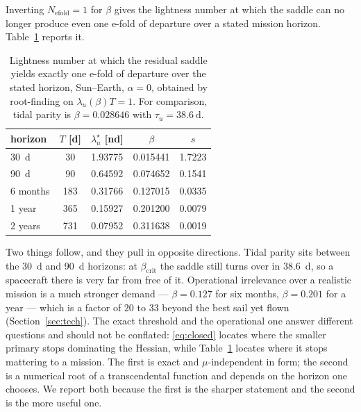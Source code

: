 \documentclass[pdflatex,sn-mathphys-num]{sn-jnl}
\begin{document}
Inverting $N_{\mathrm{efold}}=1$ for $\beta$ gives the lightness number at which
the saddle can no longer produce even one e-fold of departure over a stated
mission horizon. Table~\ref{tab:efold} reports it.

\begin{table}[t]
  \centering
  \caption{Lightness number at which the residual saddle yields exactly one
  e-fold of departure over the stated horizon, Sun--Earth, $\alpha=0$, obtained
  by root-finding on $\lambda_u(\beta)T=1$. For comparison, tidal parity is
  $\beta=\num{0.028646}$ with $\tau_u=\SI{38.6}{\day}$.}
  \label{tab:efold}
  \begin{tabular}{lcccc}
    \toprule
    horizon & $T$ [d] & $\lambda_u^{\star}$ [nd] & $\beta$ & $s$ \\
    \midrule
    \SI{30}{\day}  & \num{30}  & \num{1.93775} & \num{0.015441} & \num{1.7223} \\
    \SI{90}{\day}  & \num{90}  & \num{0.64592} & \num{0.074652} & \num{0.1541} \\
    6 months       & \num{183} & \num{0.31766} & \num{0.127015} & \num{0.0335} \\
    1 year         & \num{365} & \num{0.15927} & \num{0.201200} & \num{0.0079} \\
    2 years        & \num{731} & \num{0.07952} & \num{0.311638} & \num{0.0019} \\
    \bottomrule
  \end{tabular}
\end{table}

Two things follow, and they pull in opposite directions. Tidal parity sits
between the \SI{30}{\day} and \SI{90}{\day} horizons: at $\beta_{\mathrm{crit}}$
the saddle still turns over in \SI{38.6}{\day}, so a spacecraft there is very
far from free of it. Operational irrelevance over a realistic mission is a much
stronger demand --- $\beta=0.127$ for six months, $\beta=0.201$ for a year ---
which is a factor of $20$ to $33$ beyond the best sail yet flown
(Section~\ref{sec:tech}). The exact threshold and the operational one answer
different questions and should not be conflated: \eqref{eq:closed} locates where
the smaller primary stops dominating the Hessian, while
Table~\ref{tab:efold} locates where it stops mattering to a mission. The first
is exact and $\mu$-independent in form; the second is a numerical root of a
transcendental function and depends on the horizon one chooses. We report both
because the first is the sharper statement and the second is the more useful
one.
\end{document}
